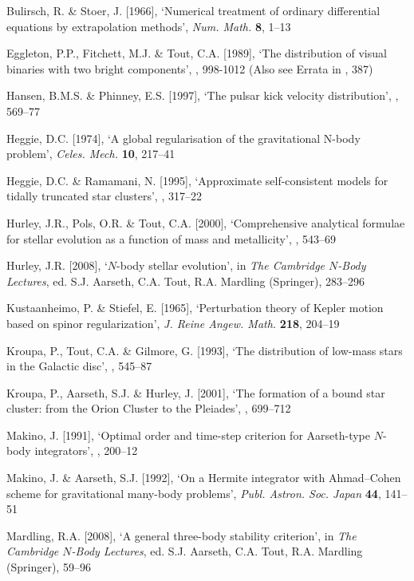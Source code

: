\documentclass[12pt]{article}
\begin{document}
\medskip
\noindent
Bulirsch, R. \& Stoer, J. [1966], `Numerical treatment of ordinary differential
equations by extrapolation methods',
{\it Num. Math.} {\bf 8}, 1--13

\medskip
\noindent
Eggleton, P.P., Fitchett, M.J. \& Tout, C.A. [1989], `The distribution of visual
binaries with two bright components',
, 998-1012 (Also see Errata in , 387)

\medskip
\noindent
Hansen, B.M.S. \& Phinney, E.S. [1997], `The pulsar kick velocity distribution',
, 569--77

\medskip
\noindent
Heggie, D.C. [1974], `A global regularisation of the gravitational N-body problem',
{\it Celes. Mech.} {\bf 10}, 217--41

\medskip
\noindent
Heggie, D.C. \& Ramamani, N. [1995], `Approximate self-consistent models for
tidally truncated star clusters',
, 317--22

\medskip
\noindent
Hurley, J.R., Pols, O.R. \& Tout, C.A. [2000], `Comprehensive analytical formulae
for stellar evolution as a function of mass and metallicity',
, 543--69

\medskip
\noindent
Hurley, J.R. [2008], `$N$-body stellar evolution',
in {\it The Cambridge $N$-Body Lectures}, ed. S.J. Aarseth, C.A. Tout,
R.A. Mardling (Springer), 283--296

\medskip
\noindent
Kustaanheimo, P. \& Stiefel, E. [1965], `Perturbation theory of Kepler motion
based on spinor regularization',
{\it J. Reine Angew. Math.} {\bf 218}, 204--19

\medskip
\noindent
Kroupa, P., Tout, C.A. \& Gilmore, G. [1993], `The distribution of low-mass stars
in the Galactic disc',
, 545--87

\medskip
\noindent
Kroupa, P., Aarseth, S.J. \& Hurley, J. [2001], `The formation of a bound star
cluster: from the Orion Cluster to the Pleiades', , 699--712

\medskip
\noindent
Makino, J. [1991], `Optimal order and time-step criterion for Aarseth-type
$N$-body integrators', , 200--12

\medskip
\noindent
Makino, J. \& Aarseth, S.J. [1992], `On a Hermite integrator with Ahmad--Cohen
scheme for gravitational many-body problems',
{\it Publ. Astron. Soc. Japan} {\bf 44}, 141--51

\medskip
\noindent
Mardling, R.A. [2008], `A general three-body stability criterion',
in {\it The Cambridge $N$-Body Lectures}, ed. S.J. Aarseth, C.A. Tout,
R.A. Mardling (Springer), 59--96
\end{document}
